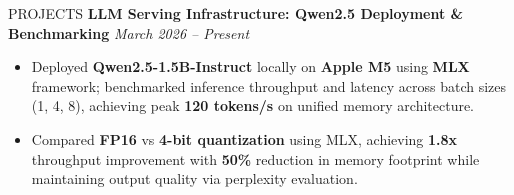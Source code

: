 \begin{rSection}{PROJECTS}
\textbf{LLM Serving Infrastructure: Qwen2.5 Deployment \& Benchmarking} \hfill
\textit{March 2026 – Present}
\begin{itemize}
\item Deployed \textbf{Qwen2.5-1.5B-Instruct} locally on 
    \textbf{Apple M5} using \textbf{MLX} framework; benchmarked 
    inference throughput and latency across batch sizes (1, 4, 8), 
    achieving peak \textbf{120 tokens/s} on unified memory architecture.

\item Compared \textbf{FP16} vs \textbf{4-bit quantization} using 
    MLX, achieving \textbf{1.8x} throughput improvement with 
    \textbf{50\%} reduction in memory footprint while 
    maintaining output quality via perplexity evaluation.
\end{itemize}











\end{rSection} 
